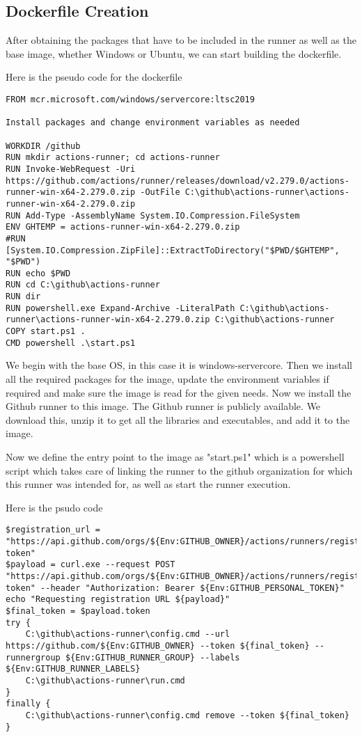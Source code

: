 \subsection{Dockerfile Creation}
After obtaining the packages that have to be included in the runner as well as the base image, whether Windows or Ubuntu, we can start building the dockerfile.

Here is the pseudo code for the dockerfile

\begin{lstlisting}[breaklines]
FROM mcr.microsoft.com/windows/servercore:ltsc2019

Install packages and change environment variables as needed

WORKDIR /github
RUN mkdir actions-runner; cd actions-runner
RUN Invoke-WebRequest -Uri https://github.com/actions/runner/releases/download/v2.279.0/actions-runner-win-x64-2.279.0.zip -OutFile C:\github\actions-runner\actions-runner-win-x64-2.279.0.zip
RUN Add-Type -AssemblyName System.IO.Compression.FileSystem 
ENV GHTEMP = actions-runner-win-x64-2.279.0.zip
#RUN [System.IO.Compression.ZipFile]::ExtractToDirectory("$PWD/$GHTEMP", "$PWD")
RUN echo $PWD
RUN cd C:\github\actions-runner
RUN dir
RUN powershell.exe Expand-Archive -LiteralPath C:\github\actions-runner\actions-runner-win-x64-2.279.0.zip C:\github\actions-runner
COPY start.ps1 .
CMD powershell .\start.ps1
\end{lstlisting}

We begin with the base OS, in this case it is windows-servercore. Then we install all the required packages for the image, update the environment variables if required and make sure the image is read for the given needs. Now we install the Github runner to this image. The Github runner is publicly available. We download this, unzip it to get all the libraries and executables, and add it to the image.

Now we define the entry point to the image as "start.ps1" which is a powershell script which takes care of linking the runner to the github organization for which this runner was intended for, as well as start the runner execution.

Here is the psudo code

\begin{lstlisting}[breaklines]
$registration_url = "https://api.github.com/orgs/${Env:GITHUB_OWNER}/actions/runners/registration-token"
$payload = curl.exe --request POST "https://api.github.com/orgs/${Env:GITHUB_OWNER}/actions/runners/registration-token" --header "Authorization: Bearer ${Env:GITHUB_PERSONAL_TOKEN}"
echo "Requesting registration URL ${payload}"
$final_token = $payload.token
try {
    C:\github\actions-runner\config.cmd --url https://github.com/${Env:GITHUB_OWNER} --token ${final_token} --runnergroup ${Env:GITHUB_RUNNER_GROUP} --labels ${Env:GITHUB_RUNNER_LABELS}
    C:\github\actions-runner\run.cmd
}
finally {
    C:\github\actions-runner\config.cmd remove --token ${final_token}
}
\end{lstlisting}

